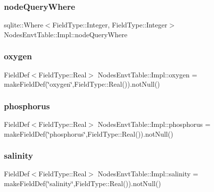 \subsubsection{\texorpdfstring{nodeQueryWhere}{nodeQueryWhere}}
{\footnotesize\ttfamily sqlite\+::\+Where$<$Field\+Type\+::\+Integer, Field\+Type\+::\+Integer$>$ Nodes\+Envt\+Table\+::\+Impl\+::node\+Query\+Where}

\mbox{\label{struct_nodes_envt_table_1_1_impl_afeb94532a29260a2af3ce82a13c0d5da}} 
\subsubsection{\texorpdfstring{oxygen}{oxygen}}
{\footnotesize\ttfamily Field\+Def$<$Field\+Type\+::\+Real$>$ Nodes\+Envt\+Table\+::\+Impl\+::oxygen = make\+Field\+Def(\char`\"{}oxygen\char`\"{},Field\+Type\+::\+Real()).not\+Null()}

\mbox{\label{struct_nodes_envt_table_1_1_impl_a7c316079dd11ceff2dfd27f99a41ee6d}} 
\subsubsection{\texorpdfstring{phosphorus}{phosphorus}}
{\footnotesize\ttfamily Field\+Def$<$Field\+Type\+::\+Real$>$ Nodes\+Envt\+Table\+::\+Impl\+::phosphorus = make\+Field\+Def(\char`\"{}phosphorus\char`\"{},Field\+Type\+::\+Real()).not\+Null()}

\mbox{\label{struct_nodes_envt_table_1_1_impl_a267a345e148089ab010036b380c9a3c5}} 
\subsubsection{\texorpdfstring{salinity}{salinity}}
{\footnotesize\ttfamily Field\+Def$<$Field\+Type\+::\+Real$>$ Nodes\+Envt\+Table\+::\+Impl\+::salinity = make\+Field\+Def(\char`\"{}salinity\char`\"{},Field\+Type\+::\+Real()).not\+Null()}

